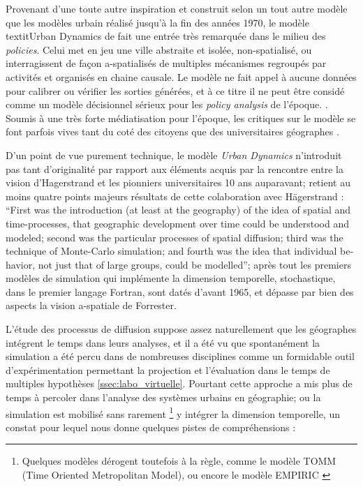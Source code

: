 Provenant d'une toute autre inspiration et construit selon un tout autre modèle que les modèles urbain réalisé jusqu'à la fin des années 1970, le modèle textit{Urban Dynamics} de \textcite{Forrester1969} fait une entrée très remarquée dans le milieu des \textit{policies}. Celui met en jeu une ville abstraite et isolée, non-spatialisé, ou interragissent de façon a-spatialisés de multiples mécanismes regroupés par activités et organisés en chaine causale. Le modèle ne fait appel à aucune données pour calibrer ou vérifier les sorties générées, et à ce titre il ne peut être considé comme un modèle décisionnel sérieux pour les \textit{policy analysis} de l'époque. \autocite{Lee1973}. Soumis à une très forte médiatisation pour l'époque, les critiques sur le modèle se font parfois vives tant du coté des citoyens \autocite{Forrester1989, Forrester2007} que des universitaires géographes \autocite{Tobler1970a, Berry1970, Batty1971}.

D'un point de vue purement technique, le modèle \textit{Urban Dynamics} n'introduit pas tant d'originalité par rapport aux éléments acquis par la rencontre entre la vision d'Hagerstrand et les pionniers universitaires 10 ans auparavant; \textcite{Morril2005} retient au moins quatre points majeurs résultats de cette colaboration avec Hägerstrand : \foreignquote{english}{First was the introduction (at least at the geography) of the idea of spatial and time-processes, that geographic development over time could be understood and modeled; second was the particular processes of spatial diffusion; third was the technique of Monte-Carlo simulation; and fourth was the idea that individual behavior, not just that of large groups, could be modelled}; après tout les premiers modèles de simulation qui implémente la dimension temporelle, stochastique, dans le premier langage Fortran, sont datés d'avant 1965, et dépasse par bien des aspects la vision a-spatiale de Forrester.

L'étude des processus de diffusion suppose assez naturellement que les géographes intégrent le temps dans leurs analyses, et il a été vu que spontanément la simulation a été percu dans de nombreuses disciplines comme un formidable outil d'expérimentation permettant la projection et l'évaluation dans le temps de multiples hypothèses \ref{ssec:labo_virtuelle}. Pourtant cette approche a mis plus de temps à percoler dans l'analyse des systèmes urbains en géographie; ou la simulation est mobilisé sans rarement \footnote{Quelques modèles dérogent toutefois à la règle, comme le modèle TOMM (Time Oriented Metropolitan Model), ou encore le modèle EMPIRIC \textcite{Batty1972} } y intégrer la dimension temporelle, un constat pour lequel \textcite[296-297]{Batty1976} nous donne quelques pistes de compréhensions : 

